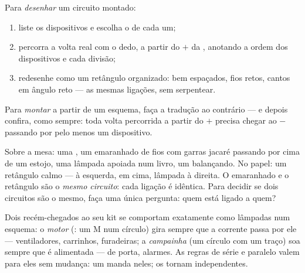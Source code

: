 \begin{method}\label{met:g6:circuits-and-safety:translate}
Para \emph{desenhar} um circuito montado:
\begin{enumerate}
  \item liste os dispositivos e escolha o  de cada um;
  \item percorra a volta real com o dedo, a partir do $+$ da ,
        anotando a ordem dos dispositivos e cada divisão;
  \item redesenhe como um retângulo organizado:  bem
        espaçados, fios retos, cantos em ângulo reto --- as mesmas
        ligações, sem serpentear.
\end{enumerate}
Para \emph{montar} a partir de um esquema, faça a tradução ao
contrário --- e depois confira, como sempre: toda volta percorrida a
partir do $+$ precisa chegar ao $-$ passando por pelo menos um
dispositivo.
\end{method}

\begin{example}\label{ex:g6:circuits-and-safety:portraits}
Sobre a mesa: uma , um emaranhado de fios com garras jacaré
passando por cima de um estojo, uma lâmpada apoiada num livro, um
 balançando. No papel: um retângulo calmo ---  à
esquerda,  em cima, lâmpada à direita. O emaranhado e o
retângulo são o \emph{mesmo circuito}: cada ligação é idêntica. Para
decidir se dois circuitos são o mesmo, faça uma única pergunta: quem
está ligado a quem?
\end{example}

\begin{example}\label{ex:g6:circuits-and-safety:motor}
Dois recém-chegados ao seu kit se comportam exatamente como lâmpadas
num esquema: o \emph{motor} (: um M num círculo)
gira sempre que a corrente passa por ele --- ventiladores, carrinhos,
furadeiras; a \emph{campainha} (um círculo com um
traço) soa sempre que é alimentada ---  de porta, alarmes.
As regras de série e paralelo valem para eles sem mudança: um
  manda neles;   os tornam
independentes.
\end{example}

